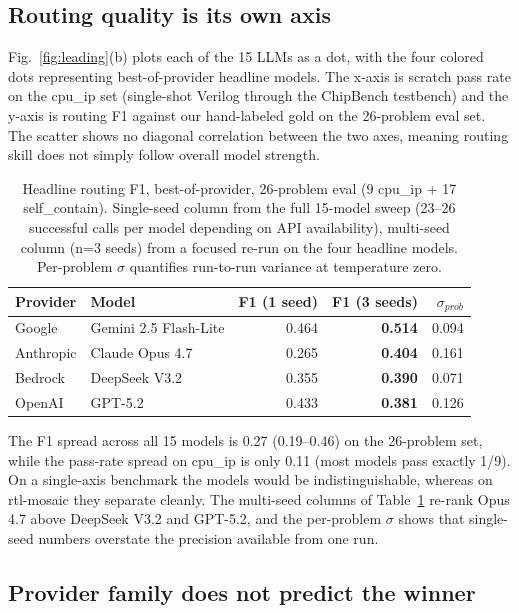\documentclass[conference]{IEEEtran}
\begin{document}
\subsection{Routing quality is its own axis}

Fig.~\ref{fig:leading}(b) plots each of the 15 LLMs as a dot, with the four colored dots representing best-of-provider headline models. The x-axis is scratch pass rate on the cpu\_ip set (single-shot Verilog through the ChipBench testbench) and the y-axis is routing F1 against our hand-labeled gold on the 26-problem eval set. The scatter shows no diagonal correlation between the two axes, meaning routing skill does not simply follow overall model strength.

\begin{table}[t]
  \caption{Headline routing F1, best-of-provider, 26-problem eval (9 cpu\_ip + 17 self\_contain). Single-seed column from the full 15-model sweep (23--26 successful calls per model depending on API availability), multi-seed column (n=3 seeds) from a focused re-run on the four headline models. Per-problem $\sigma$ quantifies run-to-run variance at temperature zero.}
  \label{tab:headline}
  \centering
  \footnotesize
  \begin{tabular}{l l r r r}
    \toprule
    Provider & Model & F1 (1 seed) & F1 (3 seeds) & $\sigma_{prob}$ \\
    \midrule
    Google    & Gemini 2.5 Flash-Lite & 0.464 & \textbf{0.514} & 0.094 \\
    Anthropic & Claude Opus 4.7       & 0.265 & \textbf{0.404} & 0.161 \\
    Bedrock   & DeepSeek V3.2         & 0.355 & \textbf{0.390} & 0.071 \\
    OpenAI    & GPT-5.2               & 0.433 & \textbf{0.381} & 0.126 \\
    \bottomrule
  \end{tabular}
\end{table}

The F1 spread across all 15 models is 0.27 (0.19--0.46) on the 26-problem set, while the pass-rate spread on cpu\_ip is only 0.11 (most models pass exactly 1/9). On a single-axis benchmark the models would be indistinguishable, whereas on rtl-mosaic they separate cleanly. The multi-seed columns of Table~\ref{tab:headline} re-rank Opus 4.7 above DeepSeek V3.2 and GPT-5.2, and the per-problem $\sigma$ shows that single-seed numbers overstate the precision available from one run.

\subsection{Provider family does not predict the winner}
\end{document}
